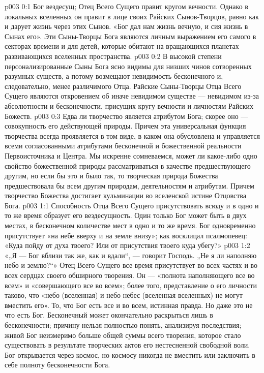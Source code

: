 \author{Божественный Советник}
\vs p003 0:1 Бог вездесущ; Отец Всего Сущего правит кругом вечности. Однако в локальных вселенных он правит в лице своих Райских Сынов\hyp{}Творцов, равно как и дарует жизнь через этих Сынов. «Бог дал нам жизнь вечную, и сия жизнь в Сынах его». Эти Сыны\hyp{}Творцы Бога являются личным выражением его самого в секторах времени и для детей, которые обитают на вращающихся планетах развивающихся вселенных пространства.
\vs p003 0:2 В высокой степени персонализированные Сыны Бога ясно видимы для низших чинов сотворенных разумных существ, а потому возмещают невидимость бесконечного и, следовательно, менее различимого Отца. Райские Сыны\hyp{}Творцы Отца Всего Сущего являются откровением об иначе невидимом существе --- невидимом из\hyp{}за абсолютности и бесконечности, присущих кругу вечности и личностям Райских Божеств.
\vs p003 0:3 \pc Едва ли творчество является атрибутом Бога; скорее оно --- совокупность его действующей природы. Причем эта универсальная функция творчества всегда проявляется в том виде, в каком она обусловлена и управляется всеми согласованными атрибутами бесконечной и божественной реальности Первоисточника и Центра. Мы искренне сомневаемся, может ли какое\hyp{}либо одно свойство божественной природы рассматриваться в качестве предшествующего другим, но если бы это и было так, то творческая природа Божества предшествовала бы всем другим природам, деятельностям и атрибутам. Причем творчество Божества достигает кульминации во вселенской истине Отцовства Бога.
\vs p003 1:1 Способность Отца Всего Сущего присутствовать всюду и в одно и то же время образует его вездесущность. Один только Бог может быть в двух местах, в бесконечном количестве мест в одно и то же время. Бог одновременно присутствует «на небе вверху и на земле внизу»; как восклицал псалмопевец: «Куда пойду от духа твоего? Или от присутствия твоего куда убегу?»
\vs p003 1:2 «„Я --- Бог вблизи так же, как и вдали“, --- говорит Господь. „Не я ли наполняю небо и землю?“» Отец Всего Сущего все время присутствует во всех частях и во всех сердцах своего обширного творения. Он --- «полнота наполняющего все во всем» и «совершающего все во всем»; более того, представление о его личности таково, что «небо (вселенная) и небо небес (вселенная вселенных) не могут вместить его». То, что Бог есть все и во всем, истинная правда. Но даже это не  что есть Бог. Бесконечный может окончательно раскрыться лишь в бесконечности; причину нельзя полностью понять, анализируя последствия; живой Бог неизмеримо больше общей суммы всего творения, которое стало существовать в результате творческих актов его нестесненной свободной воли. Бог открывается через космос, но космосу никогда не вместить или заключить в себе полноту бесконечности Бога.

